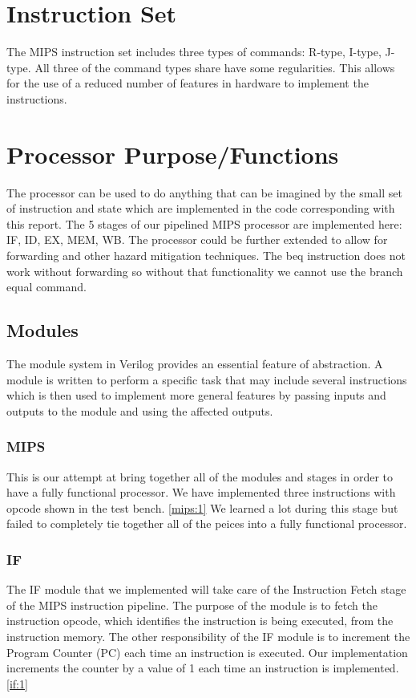 \documentclass{llncs}
\begin{document}
\section{Instruction Set}
  The MIPS instruction set includes three types of commands:  R-type, I-type, J-type. All three of the command types share
  have some regularities.  This allows for the use of a reduced number of features in hardware to implement the instructions.  \cite{1}


\section{Processor Purpose/Functions}
  The processor can be used to do anything that can be imagined by the small set of instruction and state which are implemented in the code corresponding with this report.  The 5 stages of our pipelined MIPS processor are implemented here: IF, ID, EX, MEM, WB.  The processor could be further extended to allow for forwarding and other hazard mitigation techniques.  The beq instruction does not work without forwarding so without that functionality we cannot use the branch equal command.
  
\subsection{Modules}
The module system in Verilog provides an essential feature of abstraction.  A module is written to perform a specific task that may include several instructions which is then used to implement more general features by passing inputs and outputs to the module and using the affected outputs.
\subsubsection{MIPS}
This is our attempt at bring together all of the modules and stages in order to have a fully functional processor.  We have implemented three instructions with opcode shown in the test bench. \ref{mips:1}  We learned a lot during this stage but failed to completely tie together all of the peices into a fully functional processor.  
\subsubsection{IF}
The IF module that we implemented will take care of the Instruction Fetch stage of the MIPS instruction pipeline. The purpose of the module is to fetch the instruction opcode, which identifies the instruction is being executed, from the instruction memory. The other responsibility of the IF module is to increment the Program Counter (PC) each time an instruction is executed. Our implementation increments the counter by a value of 1 each time an instruction is implemented.\ref{if:1}
\end{document}

